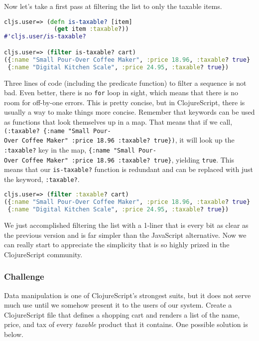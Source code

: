 \documentclass[10pt,twoside,openright]{memoir}
\begin{document}
Now let's take a first pass at filtering the list to only the taxable
items.

\begin{lstlisting}[language=Clojure]
cljs.user=> (defn is-taxable? [item]
              (get item :taxable?))
#'cljs.user/is-taxable?

cljs.user=> (filter is-taxable? cart)
({:name "Small Pour-Over Coffee Maker", :price 18.96, :taxable? true}
 {:name "Digital Kitchen Scale", :price 24.95, :taxable? true})
\end{lstlisting}

Three lines of code (including the predicate function) to filter a
sequence is not bad. Even better, there is no \texttt{for} loop in
sight, which means that there is no room for off-by-one errors. This is
pretty concise, but in ClojureScript, there is usually a way to make
things more concise. Remember that keywords can be used as functions
that look themselves up in a map. That means that if we call,
\texttt{(:taxable?\ \{:name\ "Small\ Pour-Over\ Coffee\ Maker"\ :price\ 18.96\ :taxable?\ true\})},
it will look up the \texttt{:taxable?} key in the map,
\texttt{\{:name\ "Small\ Pour-Over\ Coffee\ Maker"\ :price\ 18.96\ :taxable?\ true\}},
yielding \texttt{true}. This means that our \texttt{is-taxable?}
function is redundant and can be replaced with just the keyword,
\texttt{:taxable?}.

\begin{lstlisting}[language=Clojure]
cljs.user=> (filter :taxable? cart)
({:name "Small Pour-Over Coffee Maker", :price 18.96, :taxable? true}
 {:name "Digital Kitchen Scale", :price 24.95, :taxable? true})
\end{lstlisting}

We just accomplished filtering the list with a 1-liner that is every bit
as clear as the previous version and is far simpler than the JavaScript
alternative. Now we can really start to appreciate the simplicity that
is so highly prized in the ClojureScript community.


\subsubsection{Challenge}

Data manipulation is one of ClojureScript's strongest suits, but it does
not serve much use until we somehow present it to the users of our
system. Create a ClojureScript file that defines a shopping cart and
renders a list of the name, price, and tax of every \emph{taxable}
product that it contains. One possible solution is below.
\end{document}
